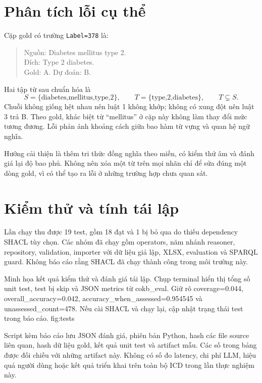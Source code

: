 \section{Phân tích lỗi cụ thể}
Cặp gold có trường \texttt{Label=378} là:
\begin{samepage}\begin{quote}
Nguồn: Diabetes mellitus type 2.\\
Đích: Type 2 diabetes.\\
Gold: A. Dự đoán: B.
\end{quote}\end{samepage}
Hai tập từ sau chuẩn hóa là
\begin{equation}
 S=\{\text{diabetes,mellitus,type,2}\},\qquad
 T=\{\text{type,2,diabetes}\},\qquad T\subsetneq S.
\end{equation}
Chuỗi không giống hệt nhau nên luật 1 không khớp; không có xung đột
nên luật 3 trả B. Theo gold, khác biệt từ “mellitus” ở cặp này không
làm thay đổi mức tương đương. Lỗi phản ánh khoảng cách giữa bao hàm
từ vựng và quan hệ ngữ nghĩa.

Hướng cải thiện là thêm tri thức đồng nghĩa theo miền, có kiểm thử âm
và đánh giá lại độ bao phủ. Không nên xóa một từ trên mọi nhãn chỉ để
sửa đúng một dòng gold, vì có thể tạo ra lỗi ở những trường hợp chưa quan sát.

\section{Kiểm thử và tính tái lập}
Lần chạy  thu được
19 test, gồm 18 đạt và 1 bị bỏ qua do thiếu dependency SHACL tùy chọn.
Các nhóm đã chạy gồm operators, năm nhánh reasoner, repository,
validation, importer với dữ liệu giả lập, XLSX, evaluation và SPARQL guard.
Không báo cáo rằng SHACL đã chạy thành công trong môi trường này.

{Minh họa kết quả kiểm thử và đánh giá tái lập.}
{Chụp terminal hiển thị tổng số unit test, test bị skip và JSON metrics
từ cokb\_eval. Giữ rõ coverage=0.044, overall\_accuracy=0.042,
accuracy\_when\_assessed=0.954545 và unassessed\_count=478.
Nếu cài SHACL và chạy lại, cập nhật trạng thái test trong báo cáo.}
{fig:tests}

Script kèm báo cáo lưu JSON đánh giá, phiên bản Python, hash các file
source liên quan, hash dữ liệu gold, kết quả unit test và artifact mẫu.
Các số trong bảng được đối chiếu với những artifact này.
Không có số đo latency, chi phí LLM, hiệu quả người dùng hoặc kết quả
triển khai trên toàn bộ ICD trong lần thực nghiệm này.
